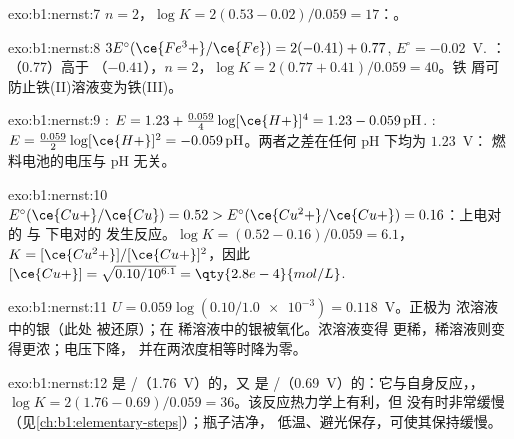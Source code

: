 \begin{solution}{exo:b1:nernst:7}
$n = 2$，$\log K = 2(0.53 - 0.02)/0.059 = 17$：。
\end{solution}

\begin{solution}{exo:b1:nernst:8}
$3E^\circ(\ce{Fe^3+}/\ce{Fe}) = 2(-0.41) + 0.77$, $E^\circ = -0.02$~V.
： （0.77）高于
（$-0.41$），$n = 2$，$\log K = 2(0.77 + 0.41)/0.059 = 40$。铁
屑可防止铁(II)溶液变为铁(III)。
\end{solution}

\begin{solution}{exo:b1:nernst:9}
: $E = 1.23 + \frac{0.059}{4}\log [\ce{H+}]^4 =
1.23 - 0.059\,\mathrm{pH}$. : $E = \frac{0.059}{2}\log
[\ce{H+}]^2 = -0.059\,\mathrm{pH}$。两者之差在任何 pH 下均为 $1.23$~V：
燃料电池的电压与 pH 无关。
\end{solution}

\begin{solution}{exo:b1:nernst:10}
$E^\circ(\ce{Cu+}/\ce{Cu}) = 0.52 > E^\circ(\ce{Cu^2+}/\ce{Cu+}) = 0.16$：上电对的
  与
下电对的  发生反应。$\log K = (0.52 - 0.16)/0.059 = 6.1$，$K =
[\ce{Cu^2+}]/[\ce{Cu+}]^2$，因此 $[\ce{Cu+}] = \sqrt{0.10/10^{6.1}} =
\qty{2.8e-4}{mol/L}$.
\end{solution}

\begin{solution}{exo:b1:nernst:11}
$U = 0.059\log(0.10/\num{1.0e-3}) = 0.118$~V。正极为
浓溶液中的银（此处  被还原）；在
稀溶液中的银被氧化。浓溶液变得
更稀，稀溶液则变得更浓；电压下降，
并在两浓度相等时降为零。
\end{solution}

\begin{solution}{exo:b1:nernst:12}
 是 /（1.76~V）的，又
是 /（0.69~V）的：它与自身反应，，
$\log K = 2(1.76 - 0.69)/0.059 = 36$。该反应热力学上有利，但
没有时非常缓慢（见\cref{ch:b1:elementary-steps}）；瓶子洁净，
低温、避光保存，可使其保持缓慢。
\end{solution}

